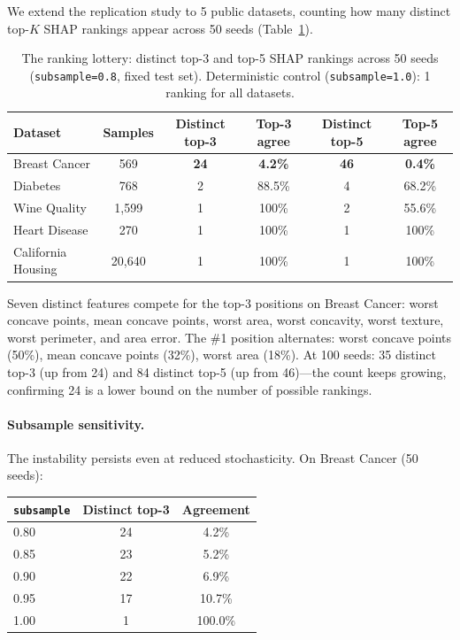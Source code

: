 \documentclass{article}
\begin{document}
We extend the replication study to 5 public datasets, counting how many distinct top-$K$ SHAP rankings appear across 50 seeds (Table~\ref{tab:ranking-lottery-supp}).

\begin{table}[t]
\centering
\caption{The ranking lottery: distinct top-3 and top-5 SHAP rankings across 50 seeds (\texttt{subsample=0.8}, fixed test set). Deterministic control (\texttt{subsample=1.0}): 1 ranking for all datasets.}
\label{tab:ranking-lottery-supp}
\small
\begin{tabular}{@{}lccccc@{}}
\toprule
Dataset & Samples & Distinct top-3 & Top-3 agree & Distinct top-5 & Top-5 agree \\
\midrule
Breast Cancer & 569 & \textbf{24} & \textbf{4.2\%} & \textbf{46} & \textbf{0.4\%} \\
Diabetes & 768 & 2 & 88.5\% & 4 & 68.2\% \\
Wine Quality & 1,599 & 1 & 100\% & 2 & 55.6\% \\
Heart Disease & 270 & 1 & 100\% & 1 & 100\% \\
California Housing & 20,640 & 1 & 100\% & 1 & 100\% \\
\bottomrule
\end{tabular}
\end{table}

Seven distinct features compete for the top-3 positions on Breast Cancer: worst concave points, mean concave points, worst area, worst concavity, worst texture, worst perimeter, and area error. The \#1 position alternates: worst concave points (50\%), mean concave points (32\%), worst area (18\%). At 100 seeds: 35 distinct top-3 (up from 24) and 84 distinct top-5 (up from 46)---the count keeps growing, confirming 24 is a lower bound on the number of possible rankings.

\paragraph{Subsample sensitivity.}
The instability persists even at reduced stochasticity. On Breast Cancer (50 seeds):

\begin{center}
\small
\begin{tabular}{@{}lcc@{}}
\toprule
\texttt{subsample} & Distinct top-3 & Agreement \\
\midrule
0.80 & 24 & 4.2\% \\
0.85 & 23 & 5.2\% \\
0.90 & 22 & 6.9\% \\
0.95 & 17 & 10.7\% \\
1.00 & 1 & 100.0\% \\
\bottomrule
\end{tabular}
\end{center}
\end{document}

